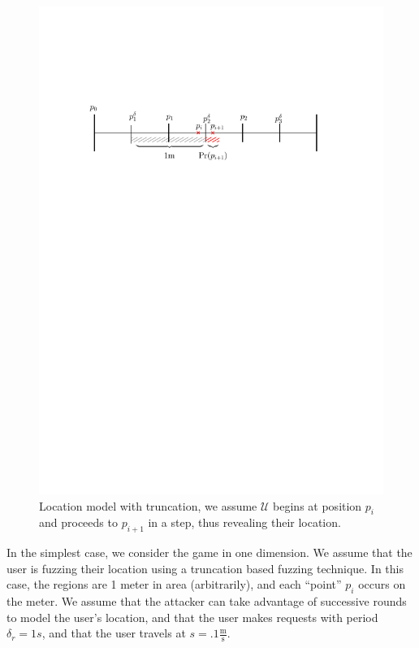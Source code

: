 \documentclass{article}
\begin{document}
\begin{figure}[h]
  \includegraphics[width=\textwidth]{threat_model_diagram_truncation_bad.pdf}
  \caption{Location model with truncation, we assume $\mathcal{U}$
    begins at position $p_i$ and proceeds to $p_{i+1}$ in a step, thus
    revealing their location.}
\end{figure}

In the simplest case, we consider the game in one dimension.  We
assume that the user is fuzzing their location using a truncation
based fuzzing technique.  In this case, the regions are 1 meter in
area (arbitrarily), and each ``point'' $p_i$ occurs on the meter.  We
assume that the attacker can take advantage of successive rounds to
model the user's location, and that the user makes requests with
period $\delta_r = 1 s$, and that the user travels at $s = .1
\frac{\textrm{m}}{\textrm{s}}$.
\end{document}
